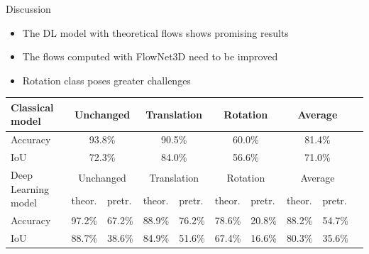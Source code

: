 \documentclass{beamer}
\begin{document}
\begin{frame}{Discussion}
    \begin{itemize}
        \item The DL model with theoretical flows shows promising results
        \item The flows computed with FlowNet3D need to be improved
        \item Rotation class poses greater challenges
    \end{itemize}
    \begin{table}
      \begin{tabular}{|l|l|l|l|l|l|l|l|l|l|}
        \hline
    
        Classical model &
          \multicolumn{2}{c|}{Unchanged} &
          \multicolumn{2}{c|}{Translation} &
          \multicolumn{2}{c|}{Rotation} &
          \multicolumn{2}{c|}{Average} \\ \hline
        Accuracy &
          \multicolumn{2}{c|}{93.8\%} &
          \multicolumn{2}{c|}{90.5\%} &
          \multicolumn{2}{c|}{60.0\%} &
          \multicolumn{2}{c|}{81.4\%} \\ \hline
        IoU &
          \multicolumn{2}{c|}{72.3\%} &
          \multicolumn{2}{c|}{84.0\%} &
          \multicolumn{2}{c|}{56.6\%} &
          \multicolumn{2}{c|}{71.0\%} \\ \hline \hline
        \multirow{2}{*}{Deep Learning model} &
          \multicolumn{2}{c}{Unchanged} &
          \multicolumn{2}{c}{Translation} &
          \multicolumn{2}{c}{Rotation} &
          \multicolumn{2}{c|}{Average} \\
        & theor. & pretr. & theor. & pretr. & theor. & pretr. & theor. & pretr. \\
        \hline
        Accuracy & 97.2\% & 67.2\% & 88.9\% & 76.2\% & 78.6\% & 20.8\% & 88.2\% & 54.7\% \\
        \hline
        IoU &      88.7\% & 38.6\% & 84.9\% & 51.6\% & 67.4\% & 16.6\% & 80.3\% & 35.6\%\\ \hline
      \end{tabular}
    \end{table}
\end{frame}
\end{document}
